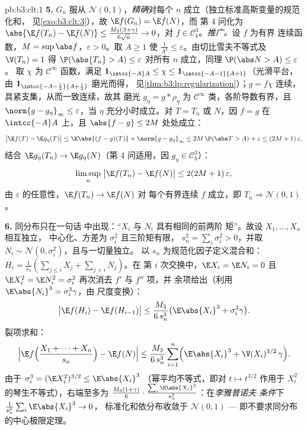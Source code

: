 \begin{solution}{pb:b3:clt:1}
\textbf{5.} $G_n$ 服从 $\mathcal N(0,1)$，\emph{精确}对每个
$n$ 成立（独立标准高斯变量的规范化和，
见\cref{exo:b3:clt:3}），故 $\E f(G_n) = \E f(N)$，而
第 4 问化为 $\abs{\E f(T_n) - \E f(N)} \leq
\frac{M_3(\beta+\gamma)}{6\sqrt n} \to 0$，对 $f \in
\mathcal C^3_b$。\emph{推广。}设 $f$ 为有界
连续函数，$M = \sup\abs f$，$\varepsilon > 0$。取 $A
\geq 1$ 使 $\frac1{A^2} \leq \varepsilon$。由切比雪夫不等式及
$\V(T_n) = 1$ 得 $\P(\abs{T_n} > A) \leq \varepsilon$
对所有 $n$ 成立，同理 $\P(\abs N > A) \leq \varepsilon$。
取 $\chi$ 为 $\mathcal C^\infty$ 函数，满足
$\mathbf 1_{\intcc{-A}A} \leq \chi \leq
\mathbf 1_{\intcc{-A-1}{A+1}}$（光滑平台，由
$\mathbf 1_{\intcc{-A-\frac12}{A+\frac12}}$ 磨光而得，
见\cref{thm:b3:lp:regularization}）；$g = f\chi$ 连续，
具紧支集，从而一致连续，故其
磨光 $g_\eta = g * \rho_\eta$ 为 $\mathcal
C^\infty$ 类，各阶导数有界，且
$\norm{g - g_\eta}_\infty \leq \varepsilon$，当 $\eta$
充分小时成立。对 $T = T_n$ 或 $N$，因 $f = g$ 在
$\intcc{-A}A$ 上，且 $\abs{f - g} \leq 2M$ 处处成立：
\[
\bigl|\E f(T) - \E g_\eta(T)\bigr| \leq
\E\abs{(f - g)(T)} + \norm{g - g_\eta}_\infty
\leq 2M\,\P(\abs T > A) + \varepsilon \leq
(2M + 1)\,\varepsilon .
\]
结合 $\E g_\eta(T_n) \to \E g_\eta(N)$（第
4 问适用，因 $g_\eta \in \mathcal C^3_b$）：
\[
\limsup_n\;\bigl|\E f(T_n) - \E f(N)\bigr| \leq
2(2M + 1)\,\varepsilon ,
\]
由 $\varepsilon$ 的任意性，$\E f(T_n) \to \E f(N)$ 对
每个有界连续 $f$ 成立，即 $T_n \Rightarrow
\mathcal N(0,1)$。

\textbf{6.} 同分布只在一句话
中出现：“$X_i$ 与 $N_i$ 具有相同的前两阶
矩”。故设 $X_1, \dots, X_n$ 相互独立，
中心化、方差为 $\sigma_i^2$ 且三阶矩有限，
$s_n^2 = \sum_i\sigma_i^2 > 0$，并取 $N_i \sim
\mathcal N(0, \sigma_i^2)$，且与一切量独立。
以 $s_n$ 为规范化因子定义混合和：$H_i =
\frac1{s_n}(\sum_{j\leq i}X_j + \sum_{j>i}N_j)$。在
第 $i$ 次交换中，$\E X_i = \E N_i = 0$ 且 $\E X_i^2 = \E N_i^2
= \sigma_i^2$ 再次消去 $f'$ 与 $f''$ 项，并
余项给出（利用 $\E\abs{N_i}^3 = \sigma_i^3\gamma$，由
尺度变换）：
\[
\bigl|\E f(H_i) - \E f(H_{i-1})\bigr| \leq
\frac{M_3}{6\,s_n^3}\bigl(\E\abs{X_i}^3 +
\sigma_i^3\gamma\bigr) .
\]
裂项求和：
\[
\Bigl|\E f\Bigl(\frac{X_1 + \dots + X_n}{s_n}\Bigr) -
\E f(N)\Bigr| \leq \frac{M_3}{6\,s_n^3}\sum_{i=1}^n
\Bigl(\E\abs{X_i}^3 + \V(X_i)^{3/2}\,\gamma\Bigr) .
\]
由于 $\sigma_i^3 = (\E X_i^2)^{3/2} \leq \E\abs{X_i}^3$
（幂平均不等式，即对 $t \mapsto
t^{3/2}$ 作用于 $X_i^2$ 的琴生不等式），右端至多为 
$\frac{M_3(1 + \gamma)}{6}\cdot
\frac{\sum_i\E\abs{X_i}^3}{s_n^3}$：在\emph{李雅普诺夫
条件}下 $\frac1{s_n^3}\sum_i\E\abs{X_i}^3 \to 0$，
标准化和依分布收敛于 $\mathcal N(0,1)$ ---
即不要求同分布的中心极限定理。


\end{solution}
